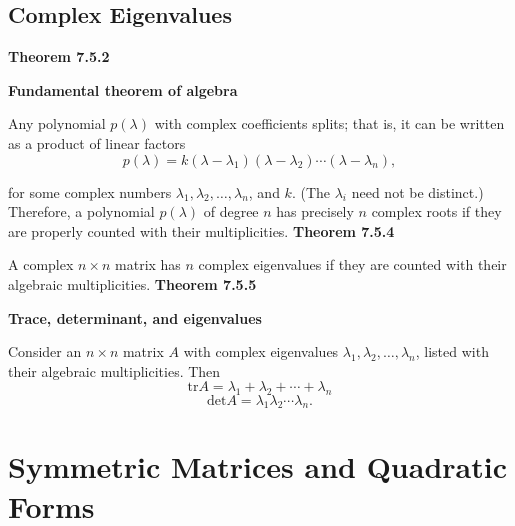 \subsection{Complex Eigenvalues}
\textbf{Theorem 7.5.2}\\
\par\noindent\textbf{Fundamental theorem of algebra}
\par\noindent Any polynomial $p(\lambda{})$ with complex coefficients splits; that is, it can be written as a product of linear factors
\[p(\lambda{})=k(\lambda{}-\lambda{}_{1})(\lambda{}-\lambda{}_{2})\cdots{}(\lambda{}-\lambda{}_{n}),\]
\par\noindent for some complex numbers $\lambda{}_{1},\lambda{}_{2},\ldots{},\lambda{}_{n}$, and $k$. (The $\lambda{}_{i}$ need not be distinct.) Therefore, a polynomial $p(\lambda{})$ of degree $n$ has precisely $n$ complex roots if they are properly counted with their multiplicities.
\textbf{Theorem 7.5.4}\\
\par\noindent A complex $n\times{}n$ matrix has $n$ complex eigenvalues if they are counted with their algebraic multiplicities.
\textbf{Theorem 7.5.5}\\
\par\noindent\textbf{Trace, determinant, and eigenvalues}
\par\noindent Consider an $n\times{}n$ matrix $A$ with complex eigenvalues $\lambda{}_{1},\lambda{}_{2},\ldots{},\lambda{}_{n}$, listed with their algebraic multiplicities. Then
\[\textrm{tr}A=\lambda{}_{1}+\lambda{}_{2}+\cdots{}+\lambda{}_{n}\]
\[\textrm{det}A=\lambda{}_{1}\lambda{}_{2}\cdots{}\lambda{}_{n}.\]

\section{Symmetric Matrices and Quadratic Forms}

